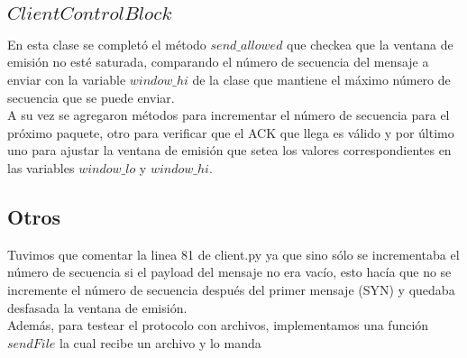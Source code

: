 \subsection{$ClientControlBlock$}

\indent En esta clase se completó el método $send\_allowed$ que checkea que la ventana de emisión no esté saturada, comparando el número de secuencia del mensaje a enviar con la variable $window\_hi$ de la clase que mantiene el máximo número de secuencia que se puede enviar.\\
\indent A su vez se agregaron métodos para incrementar el número de secuencia para el próximo paquete, otro para verificar que el ACK que llega es válido y por último uno para ajustar la ventana de emisión que setea los valores correspondientes en las variables $window\_lo$ y $window\_hi$.\\

\subsection{Otros}
\indent Tuvimos que comentar la linea 81 de client.py ya que sino sólo se incrementaba el número de secuencia si el payload del mensaje no era vacío, esto hacía que no se incremente el número de secuencia después del primer mensaje (SYN) y quedaba desfasada la ventana de emisión. \\
Además, para testear el protocolo con archivos, implementamos una función $sendFile$ la cual recibe un archivo y lo manda


